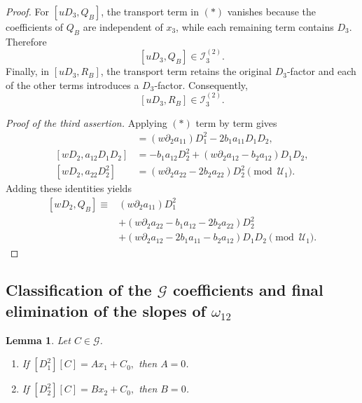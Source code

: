 \documentclass[11pt,a4paper]{article}
\numberwithin{equation}{section}
\theoremstyle{journalplain}
\newtheorem{lemma}[theorem]{Lemma}
\theoremstyle{journaldef}
\begin{document}
\begin{tcolorbox}[
  title={Proof of Theorem~\ref{Thm3.1}},
  breakable
]
\begin{proof}
For \([uD_3,Q_B]\), the transport term in \((*)\) vanishes because
the coefficients of \(Q_B\) are independent of \(x_3\), while each
remaining term contains \(D_3\). Therefore
\[
[uD_3,Q_B]\in\mathcal I_3^{(2)}.
\]
Finally, in \([uD_3,R_B]\), the transport term retains the original
\(D_3\)-factor and each of the other terms introduces a \(D_3\)-factor.
Consequently,
\[
[uD_3,R_B]\in\mathcal I_3^{(2)}.
\]

\medskip
\noindent\emph{Proof of the third assertion.}
Applying \((*)\) term by term gives
\begin{align*}
[wD_2,a_{11}D_1^2]
&=
(w\partial_2a_{11})D_1^2
-2b_1a_{11}D_1D_2,\\
[wD_2,a_{12}D_1D_2]
&=
-b_1a_{12}D_2^2
+(w\partial_2a_{12}-b_2a_{12})D_1D_2,\\
[wD_2,a_{22}D_2^2]
&=
(w\partial_2a_{22}-2b_2a_{22})D_2^2
\pmod{\mathcal U_1}.
\end{align*}
Adding these identities yields
\[
\begin{aligned}
[wD_2,Q_B]
\equiv{}&
(w\partial_2a_{11})D_1^2\\
&+(w\partial_2a_{22}-b_1a_{12}-2b_2a_{22})D_2^2\\
&+(w\partial_2a_{12}-2b_1a_{11}-b_2a_{12})D_1D_2
\pmod{\mathcal U_1}.
\end{aligned}
\]

\end{proof}
\end{tcolorbox}


\subsection{\texorpdfstring{Classification of the $\mathcal G$ coefficients
and final elimination of the slopes of $\omega_{12}$}
{Classification of the G coefficients and final elimination of the slopes of omega12}}


\begin{lemma}
\label{lem:pure-head-Lie}
Let \(C\in\mathcal G\).

\begin{enumerate}[label=\textup{(\roman*)}]
\item If
\(
[D_1^2][C]=Ax_1+C_0,
\)
then \(A=0\).

\item If
\(
[D_2^2][C]=Bx_2+C_0,
\)
then \(B=0\).
\end{enumerate}
\end{lemma}
\end{document}
